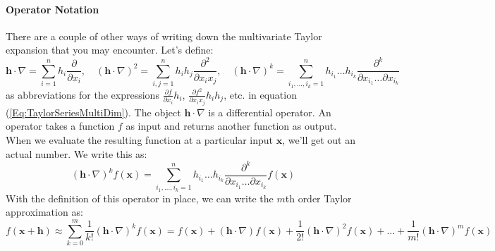 \paragraph{Operator Notation}
There are a couple of other ways of writing down the multivariate Taylor expansion that you may encounter. Let's define:
\begin{equation}
 \mathbf{h} \cdot \nabla    = \sum_{i=1}^{n} h_i \frac{\partial}{\partial x_i}, \quad
(\mathbf{h} \cdot \nabla)^2 = \sum_{i,j=1}^{n} h_i h_j \frac{\partial^2}{\partial x_i x_j}, \quad
(\mathbf{h} \cdot \nabla)^k 
= \sum_{i_1,\ldots,i_k=1}^{n} 
  h_{i_1} \ldots h_{i_k} \frac{\partial^k}{\partial x_{i_1} \ldots \partial x_{i_k}}
\end{equation}
as abbreviations for the expressions $\frac{\partial f}{\partial x_i} h_i$, $\frac{\partial f^2}{\partial x_i x_j} h_i h_j$, etc. in equation (\ref{Eq:TaylorSeriesMultiDim}). The object $\mathbf{h} \cdot \nabla$ is a differential operator. An operator takes a function $f$ as input and returns another function as output. When we evaluate the resulting function at a particular input $\mathbf{x}$, we'll get out an actual number. We write this as:
\begin{equation}
(\mathbf{h} \cdot \nabla)^k f(\mathbf{x})
= \sum_{i_1,\ldots,i_k=1}^{n} 
  h_{i_1} \ldots h_{i_k} \frac{\partial^k}{\partial x_{i_1} \ldots \partial x_{i_k}}
  f(\mathbf{x})
\end{equation}
With the definition of this operator in place, we can write the $m$th order Taylor approximation as:
\begin{equation}
 f(\mathbf{x + h}) \approx
 \sum_{k=0}^{m} \frac{1}{k!} (\mathbf{h} \cdot \nabla)^k f(\mathbf{x}) =
 f(\mathbf{x}) +  
              (\mathbf{h} \cdot \nabla)   f(\mathbf{x}) + 
 \frac{1}{2!} (\mathbf{h} \cdot \nabla)^2 f(\mathbf{x}) + \ldots +
 \frac{1}{m!} (\mathbf{h} \cdot \nabla)^m f(\mathbf{x})  
\end{equation}




